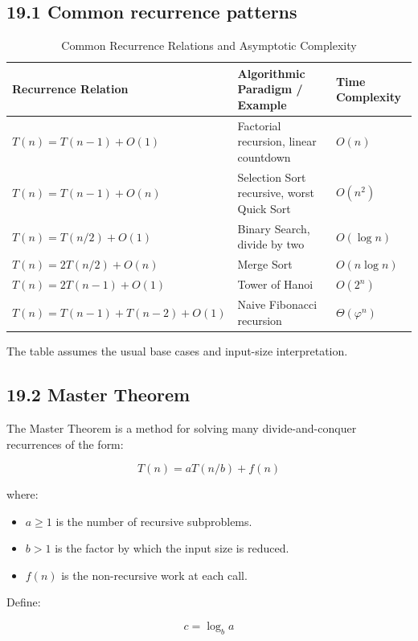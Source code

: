 \subsection{19.1 Common recurrence patterns}

\begin{table}[htbp]
\centering
\caption{Common Recurrence Relations and Asymptotic Complexity}
\label{tab:recurrence_patterns}
\begin{tabularx}{\textwidth}{p{4.8cm} X p{3.2cm}}
\toprule
\textbf{Recurrence Relation} & \textbf{Algorithmic Paradigm / Example} & \textbf{Time Complexity} \\
\midrule
$T(n) = T(n-1) + O(1)$ & Factorial recursion, linear countdown & $O(n)$ \\
$T(n) = T(n-1) + O(n)$ & Selection Sort recursive, worst Quick Sort & $O(n^2)$ \\
$T(n) = T(n/2) + O(1)$ & Binary Search, divide by two & $O(\log n)$ \\
$T(n) = 2T(n/2) + O(n)$ & Merge Sort & $O(n \log n)$ \\
$T(n) = 2T(n-1) + O(1)$ & Tower of Hanoi & $O(2^n)$ \\
$T(n) = T(n-1) + T(n-2) + O(1)$ & Naive Fibonacci recursion & $\Theta(\varphi^n)$ \\
\bottomrule
\end{tabularx}
\end{table}

The table assumes the usual base cases and input-size interpretation.

\subsection{19.2 Master Theorem}

The Master Theorem is a method for solving many divide-and-conquer recurrences of the form:


\[
\boxed{T(n)=aT(n/b)+f(n)}
\]


where:

\begin{itemize}
    \item $a\geq1$ is the number of recursive subproblems.
    \item $b>1$ is the factor by which the input size is reduced.
    \item $f(n)$ is the non-recursive work at each call.
\end{itemize}

Define:


\[
c=\log_b a
\]


